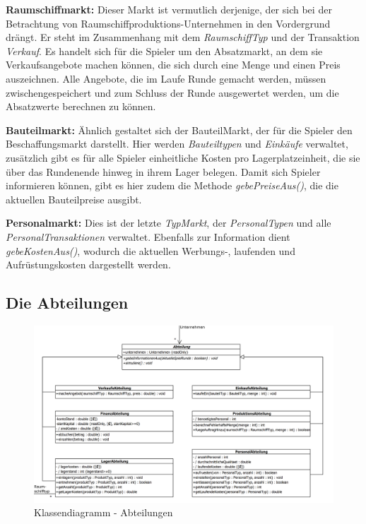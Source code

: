 \begin{seList}
\item \textbf{Raumschiffmarkt:} Dieser Markt ist vermutlich derjenige, der sich bei der Betrachtung von Raumschiffproduktions-Unternehmen in den Vordergrund drängt. Er steht im Zusammenhang mit dem \textit{RaumschiffTyp} und der Transaktion \textit{Verkauf}. Es handelt sich für die Spieler um den Absatzmarkt, an dem sie Verkaufsangebote machen können, die sich durch eine Menge und einen Preis auszeichnen. Alle Angebote, die im Laufe Runde gemacht werden, müssen zwischengespeichert und zum Schluss der Runde ausgewertet werden, um die Absatzwerte berechnen zu können.
\item \textbf{Bauteilmarkt:} Ähnlich gestaltet sich der BauteilMarkt, der für die Spieler den Beschaffungsmarkt darstellt. Hier werden \textit{Bauteiltypen} und \textit{Einkäufe} verwaltet, zusätzlich gibt es für alle Spieler einheitliche Kosten pro Lagerplatzeinheit, die sie über das Rundenende hinweg in ihrem Lager belegen. Damit sich Spieler informieren können, gibt es hier zudem die Methode \textit{gebePreiseAus()}, die die aktuellen Bauteilpreise ausgibt.
\item \textbf{Personalmarkt:} Dies ist der letzte \textit{TypMarkt}, der \textit{PersonalTypen} und alle \textit{PersonalTransaktionen} verwaltet. Ebenfalls zur Information dient \textit{gebeKostenAus()}, wodurch die aktuellen Werbungs-, laufenden und Aufrüstungskosten dargestellt werden.
\end{seList}

\subsection{Die Abteilungen}
\begin{figure}[ht]
     \centering
     \includegraphics[width=\textwidth]{30_Fachkonzept/20_Entwurf/abteilung}
     \caption{Klassendiagramm - Abteilungen}
     \label{img:fachkonzept-entwurf-abteilung}
\end{figure}

